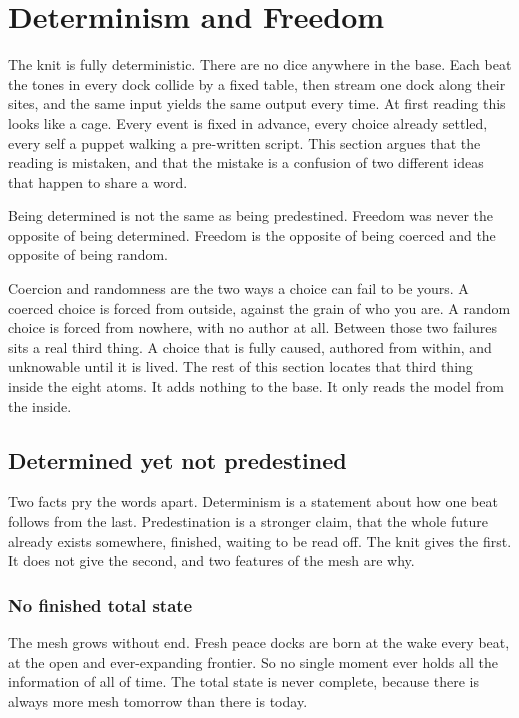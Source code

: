 \section{Determinism and Freedom}

The knit is fully deterministic. There are no dice anywhere in the base. Each beat the tones in every dock collide by a fixed table, then stream one dock along their sites, and the same input yields the same output every time. At first reading this looks like a cage. Every event is fixed in advance, every choice already settled, every self a puppet walking a pre-written script. This section argues that the reading is mistaken, and that the mistake is a confusion of two different ideas that happen to share a word.

\begin{principle}
Being determined is not the same as being predestined. Freedom was never the opposite of being determined. Freedom is the opposite of being coerced and the opposite of being random.
\end{principle}

Coercion and randomness are the two ways a choice can fail to be yours. A coerced choice is forced from outside, against the grain of who you are. A random choice is forced from nowhere, with no author at all. Between those two failures sits a real third thing. A choice that is fully caused, authored from within, and unknowable until it is lived. The rest of this section locates that third thing inside the eight atoms. It adds nothing to the base. It only reads the model from the inside.

\subsection{Determined yet not predestined}

Two facts pry the words apart. Determinism is a statement about how one beat follows from the last. Predestination is a stronger claim, that the whole future already exists somewhere, finished, waiting to be read off. The knit gives the first. It does not give the second, and two features of the mesh are why.

\subsubsection{No finished total state}

The mesh grows without end. Fresh peace docks are born at the wake every beat, at the open and ever-expanding frontier. So no single moment ever holds all the information of all of time. The total state is never complete, because there is always more mesh tomorrow than there is today.

